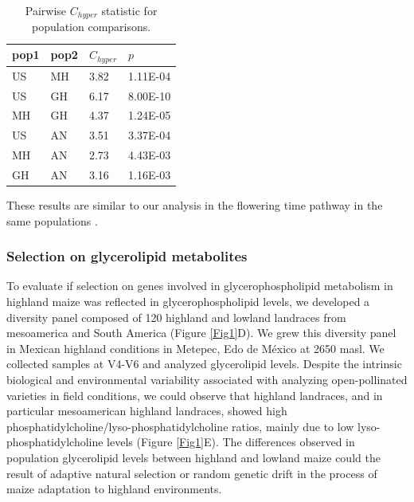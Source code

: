 \documentclass[9pt,twocolumn,twoside]{BioRxiv}
\begin{document}
\begin{table}[]
\centering
\begin{tabular}{@{}llll@{}}
\toprule
pop1 & pop2 & $C_{hyper}$   & $p$  \\ \midrule
US   & MH   & 3.82 & 1.11E-04 \\
US   & GH   & 6.17 & 8.00E-10 \\
MH   & GH   & 4.37 & 1.24E-05 \\
US   & AN   & 3.51 & 3.37E-04 \\
MH   & AN   & 2.73 & 4.43E-03 \\
GH   & AN   & 3.16 & 1.16E-03 \\ \bottomrule
\end{tabular}
\caption{Pairwise $C_{hyper}$ statistic for population comparisons.}
\label{tab:table1}
\end{table}

These results are similar to our analysis in the flowering time pathway in the same populations \cite{Wang2020-mp}. 

\subsubsection{Selection on glycerolipid metabolites} 
To evaluate if selection on genes involved in glycerophospholipid metabolism in highland maize was reflected in glycerophospholipid levels, we developed a diversity panel composed of 120 highland and lowland landraces from mesoamerica and South America (Figure \ref{Fig1}D). 
We grew this diversity panel in Mexican highland conditions in Metepec, Edo de México at 2650 masl.
We collected samples at V4-V6 and analyzed glycerolipid levels. 
Despite the intrinsic biological and environmental variability associated with analyzing open-pollinated varieties in field conditions, we could observe that highland landraces, and in particular mesoamerican highland landraces, showed  high phosphatidylcholine/lyso-phosphatidylcholine ratios, mainly due to low lyso-phosphatidylcholine levels (Figure \ref{Fig1}E). 
The differences observed in population glycerolipid levels between highland and lowland maize could the result of adaptive natural selection or random genetic drift in the process of maize adaptation to highland environments.
\end{document}
